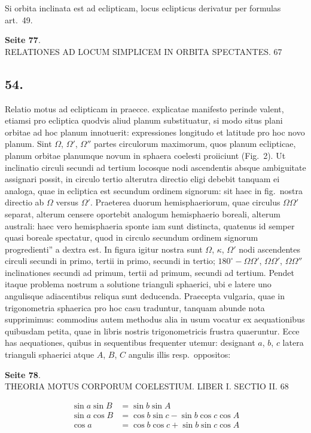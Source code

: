 \documentclass[12pt,a4paper]{article}
\begin{document}
Si orbita inclinata est ad eclipticam, locus eclipticus derivatur per formulas art.~49.

\textbf{Seite 77}.\\
RELATIONES AD LOCUM SIMPLICEM IN ORBITA SPECTANTES. 67

\subsection*{54.}

Relatio motus ad eclipticam in praecce. explicatae manifesto perinde valent, etiamsi pro ecliptica quodvis aliud planum substituatur, si modo situs plani orbitae ad hoc planum innotuerit: expressiones longitudo et latitude pro hoc novo planum. Sint $\Omega$, $\Omega'$, $\Omega''$ partes circulorum maximorum, quos planum eclipticae, planum orbitae planumque novum in sphaera coelesti proiiciunt (Fig.~2). Ut inclinatio circuli secundi ad tertium locosque nodi ascendentis absque ambiguitate assignari possit, in circulo tertio alterutra directio eligi debebit tanquam ei analoga, quae in ecliptica est secundum ordinem signorum: sit haec in fig.~nostra directio ab $\Omega$ versus $\Omega'$. Praeterea duorum hemisphaeriorum, quae circulus $\Omega \Omega'$ separat, alterum censere oportebit analogum hemisphaerio boreali, alterum australi: haec vero hemisphaeria sponte iam sunt distincta, quatenus id semper quasi boreale spectatur, quod in circulo secundum ordinem signorum progredienti'' a dextra est. In figura igitur nostra sunt $\Omega$, $\kappa$, $\Omega'$ nodi ascendentes circuli secundi in primo, tertii in primo, secundi in tertio; $180^\circ - \Omega \Omega'$, $\Omega \Omega'$, $\Omega \Omega''$ inclinationes secundi ad primum, tertii ad primum, secundi ad tertium. Pendet itaque problema nostrum a solutione trianguli sphaerici, ubi e latere uno angulisque adiacentibus reliqua sunt deducenda. Praecepta vulgaria, quae in trigonometria sphaerica pro hoc casu traduntur, tanquam abunde nota supprimimus: commodius autem methodus alia in usum vocatur ex aequationibus quibusdam petita, quae in libris nostris trigonometricis frustra quaeruntur. Ecce has aequationes, quibus in sequentibus frequenter utemur: designant $a$, $b$, $c$ latera trianguli sphaerici atque $A$, $B$, $C$ angulis illis resp.~oppositos:

\textbf{Seite 78}.\\
THEORIA MOTUS CORPORUM COELESTIUM. LIBER I. SECTIO II. 68

\begin{align}
\sin a \sin B &= \sin b \sin A \\
\sin a \cos B &= \cos b \sin c - \sin b \cos c \cos A \\
\cos a &= \cos b \cos c + \sin b \sin c \cos A
\end{align}
\end{document}
